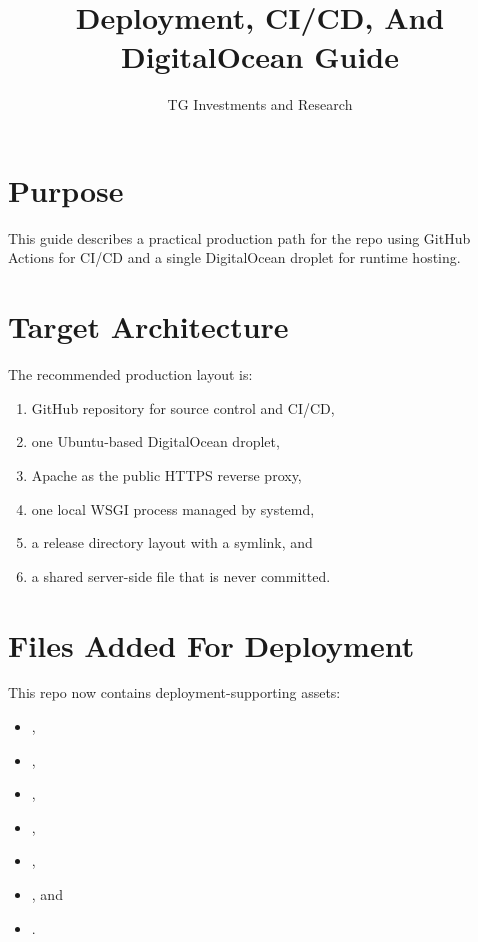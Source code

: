 \documentclass[11pt]{article}
\title{Deployment, CI/CD, And DigitalOcean Guide\\\large \product}
\author{TG Investments and Research}
\date{\docdate}
\begin{document}
\maketitle
\tableofcontents
\newpage

\section{Purpose}
This guide describes a practical production path for the repo using GitHub Actions for CI/CD and a single DigitalOcean droplet for runtime hosting.

\section{Target Architecture}
The recommended production layout is:
\begin{enumerate}[leftmargin=1.5em]
    \item GitHub repository for source control and CI/CD,
    \item one Ubuntu-based DigitalOcean droplet,
    \item Apache as the public HTTPS reverse proxy,
    \item one local WSGI process managed by systemd,
    \item a release directory layout with a  symlink, and
    \item a shared server-side  file that is never committed.
\end{enumerate}

\section{Files Added For Deployment}
This repo now contains deployment-supporting assets:
\begin{itemize}[leftmargin=1.5em]
    \item {},
    \item {},
    \item {},
    \item {},
    \item {},
    \item {}, and
    \item {}.
\end{itemize}
\end{document}
